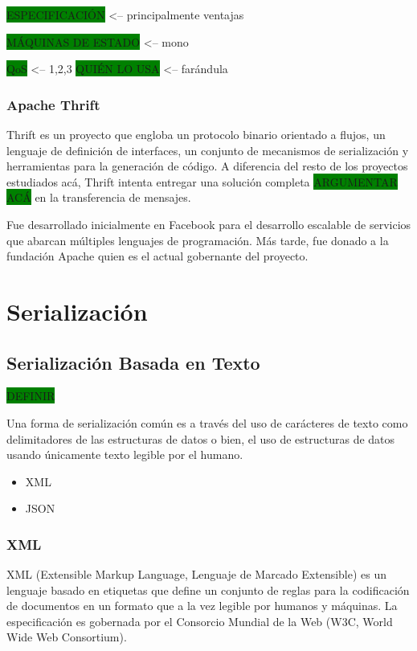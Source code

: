 \colorbox{green}{ESPECIFICACIÓN} <-- principalmente ventajas

\colorbox{green}{MÁQUINAS DE ESTADO} <-- mono

\colorbox{green}{QoS} <-- 1,2,3
\colorbox{green}{QUIÉN LO USA} <-- farándula

\subsubsection{Apache Thrift}

Thrift es un proyecto que engloba un protocolo binario orientado a flujos, un lenguaje de definición de interfaces, un conjunto de mecanismos de serialización y herramientas para la generación de código. A diferencia del resto de los proyectos estudiados acá, Thrift intenta entregar una solución completa \colorbox{green}{ARGUMENTAR ACÁ} en la transferencia de mensajes.

Fue desarrollado inicialmente en Facebook para el desarrollo escalable de servicios que abarcan múltiples lenguajes de programación. Más tarde, fue donado a la fundación Apache quien es el actual gobernante del proyecto.

\section{Serialización}

\subsection{Serialización Basada en Texto}

\colorbox{green}{DEFINIR}

Una forma de serialización común es a través del uso de carácteres de texto como delimitadores de las estructuras de datos o bien, el uso de estructuras de datos usando únicamente texto legible por el humano.

\begin{itemize}
  \item XML
  \item JSON
\end{itemize}

\subsubsection{XML}
XML (Extensible Markup Language, Lenguaje de Marcado Extensible) es un lenguaje basado en etiquetas que define un conjunto de reglas para la codificación de documentos en un formato que a la vez legible por humanos y máquinas. La especificación es gobernada por el Consorcio Mundial de la Web (W3C, World Wide Web Consortium).

